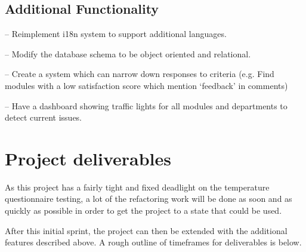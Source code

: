 \documentclass[11pt,fleqn,twoside]{article}
\begin{document}
\subsection{Additional Functionality}
\begin{description}[itemindent=-2em,leftmargin=4em]
	\item[Internationalisation (i18n)] -- Reimplement i18n system to support additional languages.
	\item[Relational Database] -- Modify the database schema to be object oriented and relational.
	\item[Advanced Analytics] -- Create a system which can narrow down responses to criteria (e.g. Find modules with a low satisfaction score which mention `feedback' in comments)
	\item[Traffic Light Dashboard] -- Have a dashboard showing traffic lights for all modules and departments to detect current issues.
\end{description}


\section{Project deliverables}

As this project has a fairly tight and fixed deadlight on the temperature questionnaire testing, a lot of the refactoring work will be done as soon and as quickly as possible in order to get the project to a state that could be used.

After this initial sprint, the project can then be extended with the additional features described above.
A rough outline of timeframes for deliverables is below.
\end{document}

